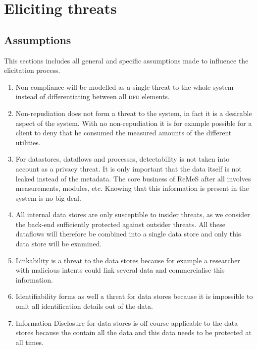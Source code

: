 \section{Eliciting threats}
\label{sec:eliciting-threats}

\subsection{Assumptions}

\npar This sections includes all general and specific assumptions made to
influence the elicitation process.

\begin{enumerate}

  \item Non-compliance will be modelled as a single threat to the whole system
  instead of differentiating between all \textsc{dfd} elements.
  \item Non-repudiation does not form a threat to the system, in fact it is a
  desirable aspect of the system. With no non-repudiation it is for
  example possible for a client to deny that he consumed the measured amounts
  of the different utilities.
  \item For datastores, dataflows and processes, detectability is not taken into
  account as a privacy threat. It is only important that the data itself is not
  leaked instead of the metadata. The core business of ReMeS after all involves
  measurements, modules, etc. Knowing that this information is present in the
  system is no big deal.
  
  \item All internal data stores are only susceptible to insider threats, as we
  consider the back-end sufficiently protected against outsider threats. All
  these dataflows will therefore be combined into a single data store and only
  this data store will be examined.
  \item Linkability is a threat to the data stores because for example a
  researcher with malicious intents could link several data and commercialise
  this information.
  \item Identifiability forms as well a threat for data stores because it is
  impossible to omit all identification details out of the data. 
  \item Information Disclosure for data stores is off course applicable to the
  data stores because the contain all the data and this data needs to be
  protected at all times.
  

\end{enumerate}
